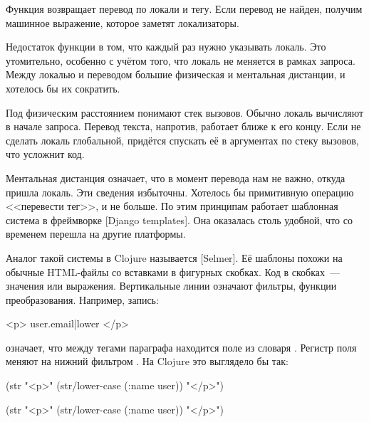 \fi


Функция  возвращает перевод по локали и тегу. Если перевод не найден,
получим машинное выражение, которое заметят локализаторы.

Недостаток функции в том, что каждый раз нужно указывать локаль. Это
утомительно, особенно с учётом того, что локаль не меняется в рамках
запроса. Между локалью и переводом большие физическая и ментальная
дистанции, и хотелось бы их сократить.


Под физическим расстоянием понимают стек вызовов. Обычно локаль вычисляют в
начале запроса. Перевод текста, напротив, работает ближе к его концу. Если не
сделать локаль глобальной, придётся спускать её в аргументах по стеку вызовов,
что усложнит код.


Ментальная дистанция означает, что в момент перевода нам не важно, откуда пришла
локаль. Эти сведения избыточны. Хотелось бы примитивную операцию <<перевести
тег>>, и не больше. По этим принципам работает шаблонная система в фреймворке
[Django templates].
Она оказалась столь удобной, что со временем перешла на другие платформы.


Аналог такой системы в Clojure называется [Selmer].
Её шаблоны похожи на обычные HTML-файлы со вставками в фигурных скобках. Код в
скобках~--- значения или выражения. Вертикальные линии означают фильтры, функции
преобразования. Например, запись:

\begin{htmldjango}
<p>{{ user.email|lower }}</p>
\end{htmldjango}

\noindent
означает, что между тегами параграфа находится поле  из словаря
. Регистр поля меняют на нижний фильтром . На Clojure
это выглядело бы так:

\ifnarrow

\begin{clojure}
(str "<p>"
     (str/lower-case (:name user))
     "</p>")
\end{clojure}

\else

\begin{clojure}
(str "<p>" (str/lower-case (:name user)) "</p>")
\end{clojure}

